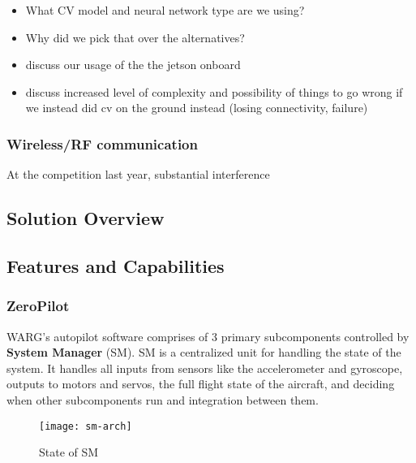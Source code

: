 \begin{itemize}
	\item What CV model and neural network type are we using?
	\item Why did we pick that over the alternatives?
	\item discuss our usage of the the jetson onboard 
	\item discuss increased level of complexity and possibility of things to
		go wrong if we instead did cv on the ground instead (losing
		connectivity, failure)
\end{itemize}

\subsubsection{Wireless/RF communication}

At the competition last year, substantial interference 

%
%

\subsection{Solution Overview}




%
%

\subsection{Features and Capabilities}

\subsubsection{ZeroPilot}

WARG's autopilot software comprises of 3 primary subcomponents controlled by
\textbf{System Manager} (SM). SM is a centralized unit for handling the state
of the system. It handles all inputs from sensors like the accelerometer and
gyroscope, outputs to motors and servos, the full flight state of the aircraft,
and deciding when other subcomponents run and integration between them.

\begin{figure}[h]
	\caption{State of SM}
	\centering
	\texttt{[image: sm-arch]}
\end{figure}

